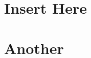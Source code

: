 \begin{appendices}
\renewcommand{\appendixname}{}%
\appendix
\addappheadtotoc
\chapter{Insert Here}
\label{app:Insert Here}	
\newpage

\chapter{Another}
\label{app:Another}
\end{appendices}